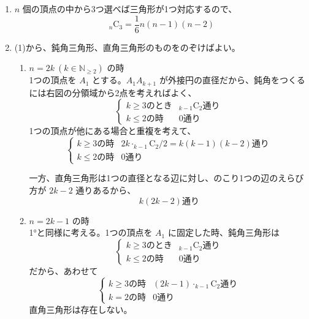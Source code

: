 \documentclass[../main.tex]{subfiles}
\begin{document}
\noindent
[\textbf{解}]
\begin{enumerate}
  \item[(1)] $n$ 個の頂点の中から3つ選べば三角形が1つ対応するので、
    \[
      _n\mathrm{C}_3 = \frac{1}{6}n(n-1)(n-2)
    \]

  \item[(2)] (1)から、鈍角三角形、直角三角形のものをのぞけばよい。

    \begin{enumerate}
      \item[$1^\circ$] $n = 2k\ (k \in \mathbb{N}_{\ge 2})$ の時\\
        1つの頂点を $A_1$ とする。$A_1 A_{k+1}$ が外接円の直径だから、鈍角をつくるには右図の分領域から2点を考えればよく、
        \[
          \begin{cases}
            k \ge 3 \text{のとき} & _{k-1}\mathrm{C}_2 \text{通り} \\
            k \le 2 \text{の時} & 0 \text{通り}
          \end{cases}
        \]
        1つの頂点が他にある場合と重複を考えて、
        \[
          \begin{cases}
            k \ge 3 \text{の時} & 2k \cdot _{k-1}\mathrm{C}_2 / 2 = k(k-1)(k-2) \text{通り} \\
            k \le 2 \text{の時} & 0 \text{通り}
          \end{cases}
        \]

        \begin{center}
        \end{center}

        一方、直角三角形は1つの直径となる辺に対し、のこり1つの辺のえらび方が $2k-2$ 通りあるから、
        \[
          k(2k-2) \text{通り}
        \]

      \item[$2^\circ$] $n = 2k-1$ の時\\
        1°と同様に考える。1つの頂点を $A_1$ に固定した時、鈍角三角形は
        \[
          \begin{cases}
            k \ge 3 \text{のとき} & _{k-1}\mathrm{C}_2 \text{通り} \\
            k \le 2 \text{の時} & 0 \text{通り}
          \end{cases}
        \]
        だから、あわせて
        \[
          \begin{cases}
            k \ge 3 \text{の時} & (2k-1) \cdot _{k-1}\mathrm{C}_2 \text{通り} \\
            k = 2 \text{の時} & 0 \text{通り}
          \end{cases}
        \]
        直角三角形は存在しない。


\end{enumerate}
\end{enumerate}
\end{document}
